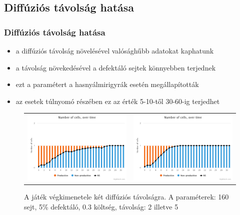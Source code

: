 \subsection{Diffúziós távolság hatása}
\begin{frame}
	\frametitle{Diffúziós távolság hatása}
	\begin{itemize}
		\item a diffúziós távolság növelésével valósághűbb adatokat kaphatunk
		\item a távolság növekedésével a defektáló sejtek könnyebben terjednek
		\item ezt a paramétert a hasnyálmirigyrák esetén megállapították\cite{archetti2015heterogeneity}
	\item az esetek túlnyomó részében ez az érték 5-10-től 30-60-ig terjedhet\cite{archetti2016cooperation}
	\end{itemize}
	
	\begin{figure}[h]
		\centering
		\begin{tabular}{cc}
			\includegraphics[width=0.4\linewidth]{images/diffdist2}
			&
			\includegraphics[width=0.4\linewidth]{images/diffdist5}
		\end{tabular}
		\caption{A játék végkimenetele két diffúziós távolságra. A paraméterek: 160 sejt, 5\% defektáló, 0.3 költség, távolság: 2 illetve 5}
		\label{fig:DiffDist}
	\end{figure}
\end{frame}

